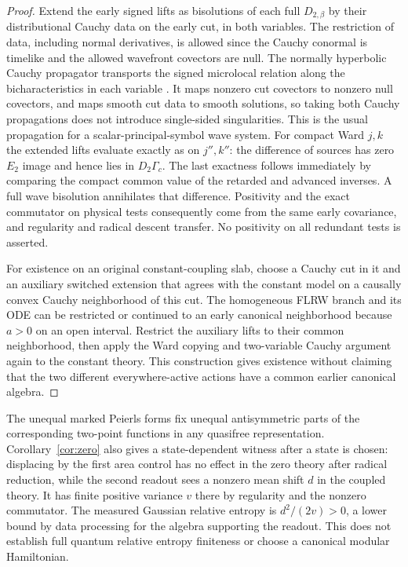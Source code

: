 \documentclass[11pt]{article}
\begin{document}
\begin{proof}
Extend the early signed lifts as bisolutions of each full $D_{2,\beta}$ by their distributional Cauchy data on the early cut, in both variables. The restriction of data, including normal derivatives, is allowed since the Cauchy conormal is timelike and the allowed wavefront covectors are null. The normally hyperbolic Cauchy propagator transports the signed microlocal relation along the bicharacteristics in each variable \cite{BGP,GOW}. It maps nonzero cut covectors to nonzero null covectors, and maps smooth cut data to smooth solutions, so taking both Cauchy propagations does not introduce single-sided singularities. This is the usual propagation for a scalar-principal-symbol wave system. For compact Ward $j,k$ the extended lifts evaluate exactly as on $j'',k''$: the difference of sources has zero $E_2$ image and hence lies in $D_2\Gamma_c$. The last exactness follows immediately by comparing the compact common value of the retarded and advanced inverses. A full wave bisolution annihilates that difference. Positivity and the exact commutator on physical tests consequently come from the same early covariance, and regularity and radical descent transfer. No positivity on all redundant tests is asserted.

For existence on an original constant-coupling slab, choose a Cauchy cut in it and an auxiliary switched extension that agrees with the constant model on a causally convex Cauchy neighborhood of this cut. The homogeneous FLRW branch and its ODE can be restricted or continued to an early canonical neighborhood because $a>0$ on an open interval. Restrict the auxiliary lifts to their common neighborhood, then apply the Ward copying and two-variable Cauchy argument again to the constant theory. This construction gives existence without claiming that the two different everywhere-active actions have a common earlier canonical algebra.
\end{proof}

The unequal marked Peierls forms fix unequal antisymmetric parts of the corresponding two-point functions in any quasifree representation. Corollary~\ref{cor:zero} also gives a state-dependent witness after a state is chosen: displacing by the first area control has no effect in the zero theory after radical reduction, while the second readout sees a nonzero mean shift $d$ in the coupled theory. It has finite positive variance $v$ there by regularity and the nonzero commutator. The measured Gaussian relative entropy is $d^2/(2v)>0$, a lower bound by data processing for the algebra supporting the readout. This does not establish full quantum relative entropy finiteness or choose a canonical modular Hamiltonian.
\end{document}
